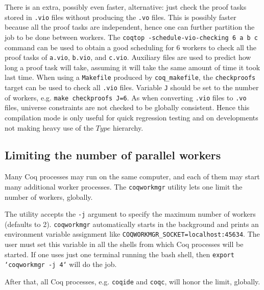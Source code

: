 There is an extra, possibly even faster, alternative: just check the
proof tasks stored in \texttt{.vio} files without producing the
\texttt{.vo} files. This is possibly faster because all the proof tasks
are independent, hence one can further partition the job to be done
between workers. The \texttt{coqtop -schedule-vio-checking 6 a b c}
command can be used to obtain a good scheduling for 6 workers to check
all the proof tasks of \texttt{a.vio}, \texttt{b.vio}, and
\texttt{c.vio}. Auxiliary files are used to predict how long a proof task
will take, assuming it will take the same amount of time it took last
time. When using a \texttt{Makefile} produced by \texttt{coq\_makefile},
the \texttt{checkproofs} target can be used to check all \texttt{.vio}
files. Variable \texttt{J} should be set to the number of workers,
e.g. \texttt{make checkproofs J=6}. As when converting \texttt{.vio}
files to \texttt{.vo} files, universe constraints are not checked to be
globally consistent. Hence this compilation mode is only useful for quick
regression testing and on developments not making heavy use of the $Type$
hierarchy.

\subsection{Limiting the number of parallel workers}
\label{coqworkmgr}

Many Coq processes may run on the same computer, and each of them may start
many additional worker processes. 
The \texttt{coqworkmgr} utility lets one limit the number of workers, globally.

The utility accepts the \texttt{-j} argument to specify the maximum number of
workers (defaults to 2). \texttt{coqworkmgr} automatically starts in the
background and prints an environment variable assignment like
\texttt{COQWORKMGR\_SOCKET=localhost:45634}. The user must set this variable in
all the shells from which Coq processes will be started.  If one uses just
one terminal running the bash shell, then \texttt{export `coqworkmgr -j 4`} will
do the job.

After that, all Coq processes, e.g. \texttt{coqide} and \texttt{coqc},
will honor the limit, globally.


